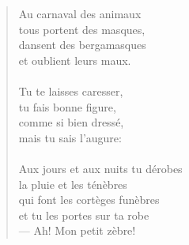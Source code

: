 \documentclass[twocolumn,11pt,a4paper]{article}
\begin{document}
\begin{verse}
\newpage

Au carnaval des animaux\\
tous portent des masques,\\
dansent des bergamasques\\
et oublient leurs maux.\\
\ \\

Tu te laisses caresser,\\
tu fais bonne figure,\\
comme si bien dressé,\\
mais tu sais l'augure:\\
\ \\

Aux jours et aux nuits tu dérobes\\
la pluie et les ténèbres\\
qui font les cortèges funèbres\\
et tu les portes sur ta robe\\
--- Ah! Mon petit zèbre!
\end{verse}
\end{document}
